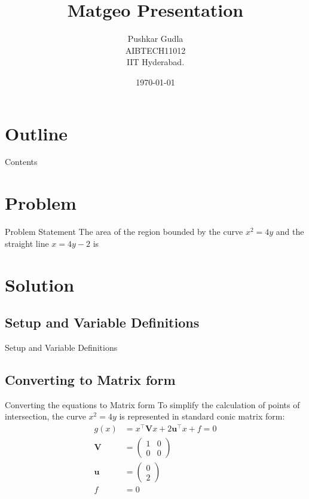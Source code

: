\documentclass{beamer}
\title{Matgeo Presentation}
\author{Pushkar Gudla \\ AIBTECH11012\\IIT Hyderabad.}
\date{\today}
\theoremstyle{remark}
\newcommand{\myvec}[1]{\ensuremath{\begin{pmatrix}#1\end{pmatrix}}}
\let\vec\mathbf
\numberwithin{equation}{section}
\begin{document}
\begin{frame}
\titlepage
\end{frame}

\section*{Outline}
\begin{frame}{Contents}
\tableofcontents    
\end{frame}

\section{Problem}
\begin{frame}{Problem Statement}
    The area of the region bounded by the curve $x^2=4y$ and the straight line $x=4y-2$ is
\end{frame}

\section{Solution}
\subsection{Setup and Variable Definitions}
\begin{frame}{Setup and Variable Definitions}
\begin{table}[h!]    
  \centering
  
  \caption{Variables and given data}
\end{table}
\end{frame}

\subsection{Converting to Matrix form}
\begin{frame}{Converting the equations to Matrix form}
    To simplify the calculation of points of intersection, the curve $x^2=4y$ is represented in standard conic matrix form:
    \begin{align}
        g(x) &= x^\top \vec{V}x + 2\vec{u}^\top x + f=0\\
        \vec{V} &= \myvec{1 & 0\\0 & 0}\\
	\vec{u} &= \myvec{0\\2}\\
	f &= 0
    \end{align}
\end{frame}
\end{document}
